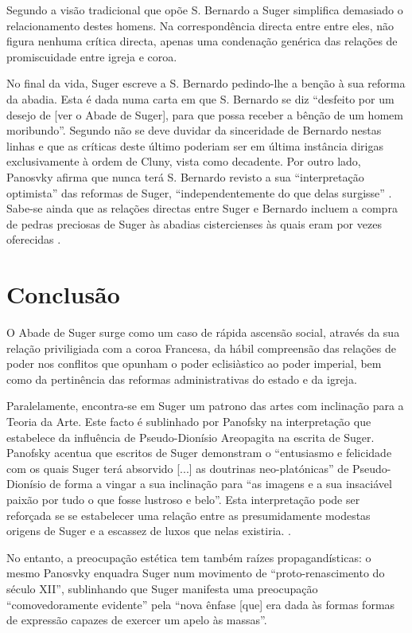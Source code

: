 \documentclass{article}
\begin{document}
Segundo \cite{calado} a visão tradicional que opõe S. Bernardo a Suger
simplifica demasiado o relacionamento destes homens. Na
correspondência directa entre entre eles, não figura nenhuma crítica
directa, apenas uma condenação genérica das relações de promiscuidade
entre igreja e coroa.

No final da vida, Suger escreve a S. Bernardo pedindo-lhe a benção à
sua reforma da abadia. Esta é dada numa carta em que S. Bernardo se
diz ``desfeito por um desejo de [ver o Abade de Suger], para que possa
receber a bênção de um homem moribundo''. Segundo \cite{umgajo} não se
deve duvidar da sinceridade de Bernardo nestas linhas e que as
críticas deste último poderiam ser em última instância dirigas
exclusivamente à ordem de Cluny, vista como decadente. Por outro lado,
Panosvky afirma que nunca terá S. Bernardo revisto a sua
``interpretação optimista'' das reformas de Suger, ``independentemente
do que delas surgisse'' \cite{panofsky-suger}. Sabe-se ainda que as
relações directas entre Suger e Bernardo incluem a compra de pedras
preciosas de Suger às abadias cistercienses às quais eram por vezes
oferecidas \cite{calado}.

\section{Conclusão}

O Abade de Suger surge como um caso de rápida ascensão social, através
da sua relação priviligiada com a coroa Francesa, da hábil compreensão
das relações de poder nos conflitos que opunham o poder eclisiàstico
ao poder imperial, bem como da pertinência das reformas
administrativas do estado e da igreja.

Paralelamente, encontra-se em Suger um patrono das artes com
inclinação para a Teoria da Arte. Este facto é sublinhado por Panofsky
na interpretação que estabelece da influência de Pseudo-Dionísio
Areopagita na escrita de Suger. Panofsky acentua que escritos de Suger
demonstram o ``entusiasmo e felicidade com os quais Suger terá
absorvido [...]  as doutrinas neo-platónicas'' de Pseudo-Dionísio de
forma a vingar a sua inclinação para ``as imagens e a sua insaciável
paixão por tudo o que fosse lustroso e belo''. Esta interpretação pode
ser reforçada se se estabelecer uma relação entre as presumidamente
modestas origens de Suger e a escassez de luxos que nelas
existiria. \cite{calado}.

No entanto, a preocupação estética tem também raízes propagandísticas:
o mesmo Panosvky \cite{panofsky-renascimento} enquadra Suger num
movimento de ``proto-renascimento do século XII'', sublinhando que
Suger manifesta uma preocupação ``comovedoramente evidente'' pela
``nova ênfase [que] era dada às formas formas de expressão capazes de
exercer um apelo às massas''.

\printbibliography[heading=bibliography,title={Bibliografia},type=book]
\end{document}
